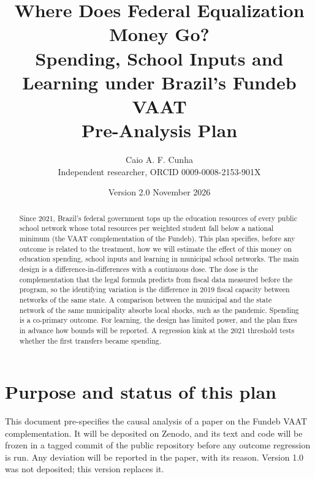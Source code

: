 \documentclass[11pt]{article}
\title{Where Does Federal Equalization Money Go?\\ Spending, School Inputs and Learning under Brazil's Fundeb VAAT\\[6pt]
\large Pre-Analysis Plan}
\author{Caio A. F. Cunha\\ \small Independent researcher, ORCID 0009-0008-2153-901X}
\date{Version 2.0 \quad November 2026}
\begin{document}
\maketitle

\begin{abstract}
\noindent Since 2021, Brazil's federal government tops up the education resources of every public school network whose total resources per weighted student fall below a national minimum (the VAAT complementation of the Fundeb). This plan specifies, before any outcome is related to the treatment, how we will estimate the effect of this money on education spending, school inputs and learning in municipal school networks. The main design is a difference-in-differences with a continuous dose. The dose is the complementation that the legal formula predicts from fiscal data measured before the program, so the identifying variation is the difference in 2019 fiscal capacity between networks of the same state. A comparison between the municipal and the state network of the same municipality absorbs local shocks, such as the pandemic. Spending is a co-primary outcome. For learning, the design has limited power, and the plan fixes in advance how bounds will be reported. A regression kink at the 2021 threshold tests whether the first transfers became spending.
\end{abstract}

\section{Purpose and status of this plan}

This document pre-specifies the causal analysis of a paper on the Fundeb VAAT complementation. It will be deposited on Zenodo, and its text and code will be frozen in a tagged commit of the public repository before any outcome regression is run. Any deviation will be reported in the paper, with its reason. Version 1.0 was not deposited; this version replaces it.
\end{document}
